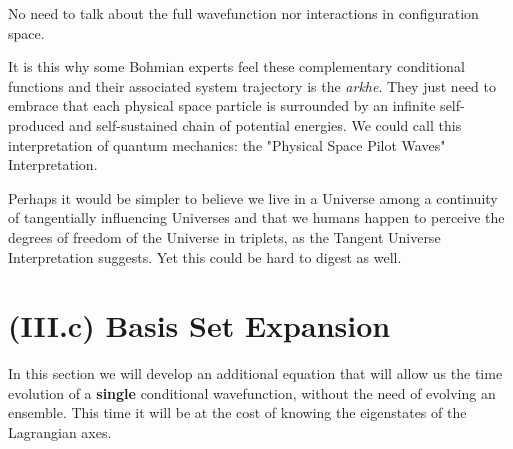 \documentclass[11pt, a4paper]{article} %
\begin{document}
No need to talk about the full wavefunction nor interactions in configuration space.

It is this why some Bohmian experts feel these complementary conditional functions and  their associated system trajectory is the {\em arkhe}. They just need to embrace that each physical space particle is surrounded by an infinite self-produced and self-sustained chain of potential energies. We could call this interpretation of quantum mechanics: the "Physical Space Pilot Waves" Interpretation.

Perhaps it would be simpler to believe we live in a Universe among a continuity of tangentially influencing Universes and that we humans happen to perceive the degrees of freedom of the Universe in triplets, as the Tangent Universe Interpretation suggests. Yet this could be hard to digest as well.
\vspace{-0.25cm}

\section*{(III.c) Basis Set Expansion\vspace{-0.2cm}}
In this section we will develop an additional equation that will allow us the time evolution of a {\bf single} conditional wavefunction, without the need of evolving an ensemble. This time it will be at the cost of knowing the eigenstates of the Lagrangian axes.
\end{document}
